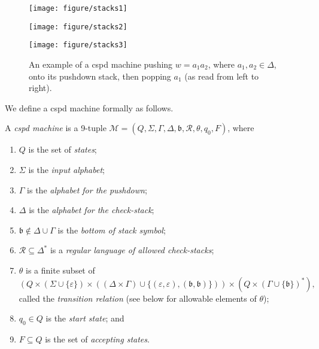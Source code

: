 \begin{figure}[!ht]
	\centering
	
	\begin{minipage}{0.3\linewidth}
		\centering
		\texttt{[image: figure/stacks1]}
	\end{minipage}
	\hfill
	\begin{minipage}{0.3\linewidth}
		\centering
		\texttt{[image: figure/stacks2]}
	\end{minipage}
	\hfill
	\begin{minipage}{0.3\linewidth}
		\centering
		\texttt{[image: figure/stacks3]}
	\end{minipage}
	
	\caption{An example of a cspd machine pushing $w = a_1 a_2$, where $a_1,a_2 \in \Delta$, onto its pushdown stack, then popping $a_1$ (as read from left to right).}%
	\label{fig:cspd stage 2}
	
\end{figure}

We define a cspd machine formally as follows.

\begin{definition}\label{def:cspd machine}
	A \emph{cspd machine} is a 9-tuple $\mathcal{M} = (Q, \Sigma, \Gamma, \Delta, \mathfrak b, \mathcal{R}, \theta, q_0, F)$, where
	\begin{enumerate}
		\item $Q$ is the set of \emph{states};
		\item $\Sigma$ is the \emph{input alphabet};
		\item $\Gamma$ is the \emph{alphabet for the pushdown};
		\item $\Delta$ is the \emph{alphabet for the check-stack};
		\item $\mathfrak{b} \notin \Delta \cup \Gamma$ is the \emph{bottom of stack symbol};
		\item $\mathcal{R} \subseteq \Delta^*$ is a \emph{regular language of allowed check-stacks};
		\item $\theta$ is a finite subset of
		\[
			(
				Q
				\times
				( \Sigma \cup \{\varepsilon\} )
				\times
				(
					(\Delta \times \Gamma)
					\cup
					\{
						(\varepsilon,\varepsilon),
						(\mathfrak{b},\mathfrak{b})
					\}
				)
			)
			\times
			( Q \times ( \Gamma \cup \{\mathfrak{b}\})^* ),
		\]
		called the \emph{transition relation} (see below for allowable elements of $\theta$);
		\item $q_0 \in Q$ is the \emph{start state}; and
		\item $F \subseteq Q$ is the set of \emph{accepting states}.
	\end{enumerate}
\end{definition}

